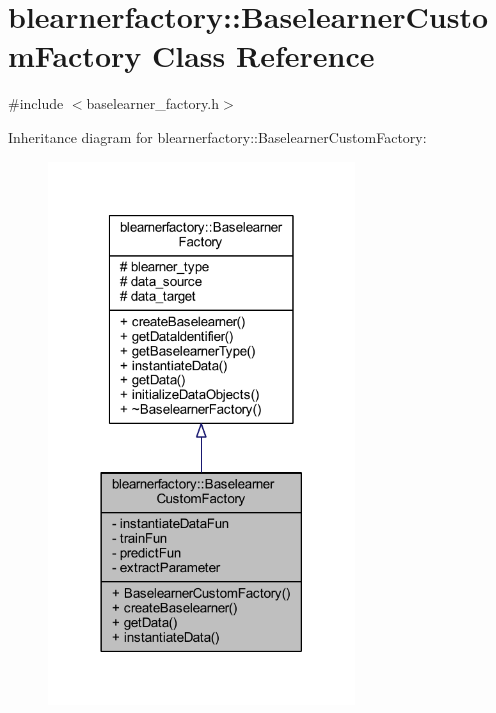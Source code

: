 \hypertarget{classblearnerfactory_1_1_baselearner_custom_factory}{}\section{blearnerfactory\+:\+:Baselearner\+Custom\+Factory Class Reference}
\label{classblearnerfactory_1_1_baselearner_custom_factory}


{\ttfamily \#include $<$baselearner\+\_\+factory.\+h$>$}



Inheritance diagram for blearnerfactory\+:\+:Baselearner\+Custom\+Factory\+:\nopagebreak
\begin{figure}[H]
\begin{center}
\leavevmode
\includegraphics[width=230pt]{classblearnerfactory_1_1_baselearner_custom_factory__inherit__graph}
\end{center}
\end{figure}


